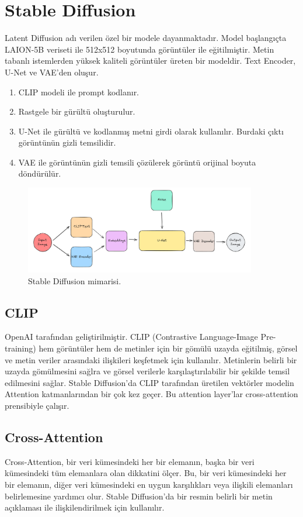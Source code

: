 \section{Stable Diffusion}
Latent Diffusion adı verilen özel bir modele dayanmaktadır. Model başlangıçta LAION-5B veriseti ile 512x512 boyutunda görüntüler ile eğitilmiştir. Metin tabanlı istemlerden yüksek kaliteli görüntüler üreten bir modeldir. Text Encoder, U-Net ve VAE'den oluşur. 
\begin{enumerate}
    \item CLIP modeli ile prompt kodlanır.
    \item Rastgele bir gürültü oluşturulur.
    \item U-Net ile gürültü ve kodlanmış metni girdi olarak kullanılır. Burdaki çıktı görüntünün gizli temsilidir.
    \item VAE ile görüntünün gizli temsili çözülerek görüntü orijinal boyuta döndürülür.
\end{enumerate}

\begin{figure}[ht]
    \centering
    \includegraphics[width=0.9\textwidth]{images/stable_diffusion_architecture.png}
    \caption{Stable Diffusion mimarisi.}
    \label{fig:enter-label}
\end{figure}

\subsection{CLIP}
OpenAI tarafından geliştirilmiştir. CLIP (Contrastive Language-Image Pre-training) hem görüntüler hem de metinler için bir gömülü uzayda eğitilmiş, görsel ve metin veriler arasındaki ilişkileri keşfetmek için kullanılır. Metinlerin belirli bir uzayda gömülmesini sağlra ve görsel verilerle karşılaştırılabilir bir şekilde temsil edilmesini sağlar. Stable Diffusion'da CLIP tarafından üretilen vektörler modelin Attention katmanlarından bir çok kez geçer. Bu attention layer'lar cross-attention prensibiyle çalışır. 

\subsection{Cross-Attention}
Cross-Attention, bir veri kümesindeki her bir elemanın, başka bir veri kümesindeki tüm elemanlara olan dikkatini ölçer. Bu, bir veri kümesindeki her bir elemanın, diğer veri kümesindeki en uygun karşılıkları veya ilişkili elemanları belirlemesine yardımcı olur. Stable Diffusion'da bir resmin belirli bir metin açıklaması ile ilişkilendirilmek için kullanılır.

